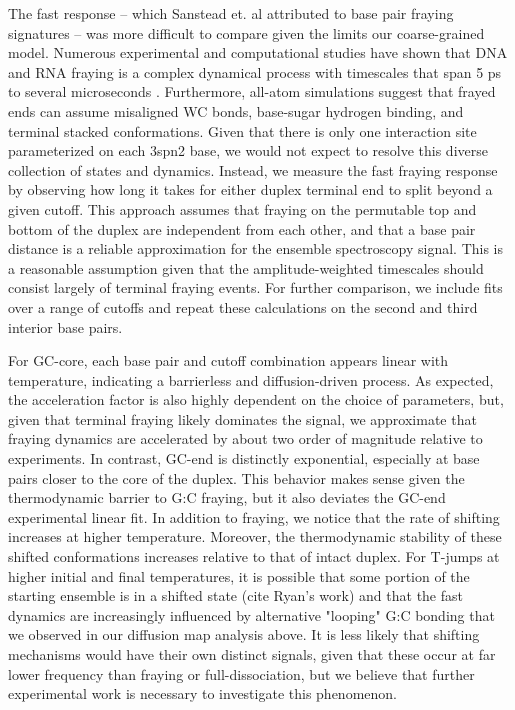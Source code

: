 \documentclass[journal=jpcbfk,manuscript=article]{achemso}
\begin{document}
The fast response -- which Sanstead et. al attributed to base pair fraying signatures -- was more difficult to compare given the limits our coarse-grained model. Numerous experimental and computational studies have shown that DNA and RNA fraying is a complex dynamical process with timescales that span 5 ps to several microseconds \citep{ Nonin1995TerminalFraying, Nikolova2012ProbingSimulations, Andreatta2006UltrafastHelix, Galindo-Murillo2015ConvergenceDGCACGAACGAACGAACGC}. Furthermore, all-atom simulations suggest that frayed ends can assume misaligned WC bonds, base-sugar hydrogen binding, and terminal stacked conformations\citep{PinamontiTheModels, Zgarbova2014BaseRNA}. Given that there is only one interaction site parameterized on each 3spn2 base, we would not expect to resolve this diverse collection of states and dynamics. Instead, we measure the fast fraying response by observing how long it takes for either duplex terminal end to split beyond a given cutoff. This approach assumes that fraying on the permutable top and bottom of the duplex are independent from each other, and that a base pair distance is a reliable approximation for the ensemble spectroscopy signal. This is a reasonable assumption given that the amplitude-weighted timescales should consist largely of terminal fraying events. For further comparison, we include fits over a range of cutoffs and repeat these calculations on the second and third interior base pairs.

For GC-core, each base pair and cutoff combination appears linear with temperature, indicating a barrierless and diffusion-driven process. As expected, the acceleration factor is also highly dependent on the choice of parameters, but, given that terminal fraying likely dominates the signal, we approximate that fraying dynamics are accelerated by about two order of magnitude relative to experiments. In contrast, GC-end is distinctly exponential, especially at base pairs closer to the core of the duplex. This behavior makes sense given the thermodynamic barrier to G:C fraying, but it also deviates the GC-end experimental linear fit. In addition to fraying, we notice that the rate of shifting increases at higher temperature. Moreover, the thermodynamic stability of these shifted conformations increases relative to that of intact duplex. For T-jumps at higher initial and final temperatures, it is possible that some portion of the starting ensemble is in a shifted state (cite Ryan's work) and that the fast dynamics are increasingly influenced by alternative "looping" G:C bonding that we observed in our diffusion map analysis above. It is less likely that shifting mechanisms would have their own distinct signals, given that these occur at far lower frequency than fraying or full-dissociation, but we believe that further experimental work is necessary to investigate this phenomenon.
\end{document}
